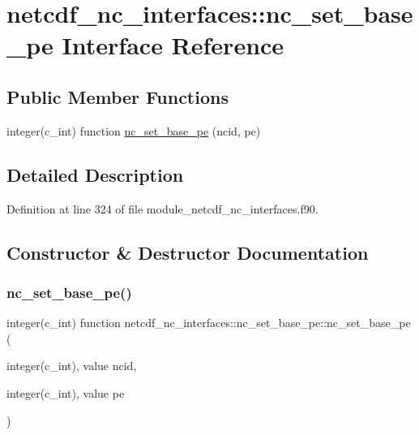 \hypertarget{interfacenetcdf__nc__interfaces_1_1nc__set__base__pe}{}\section{netcdf\+\_\+nc\+\_\+interfaces\+:\+:nc\+\_\+set\+\_\+base\+\_\+pe Interface Reference}
\label{interfacenetcdf__nc__interfaces_1_1nc__set__base__pe}
\subsection*{Public Member Functions}
\begin{DoxyCompactItemize}
\item 
integer(c\+\_\+int) function \hyperlink{interfacenetcdf__nc__interfaces_1_1nc__set__base__pe_ac69b3b3084c0d7830cab01ea902cdc50}{nc\+\_\+set\+\_\+base\+\_\+pe} (ncid, pe)
\end{DoxyCompactItemize}


\subsection{Detailed Description}


Definition at line 324 of file module\+\_\+netcdf\+\_\+nc\+\_\+interfaces.\+f90.



\subsection{Constructor \& Destructor Documentation}
\mbox{\label{interfacenetcdf__nc__interfaces_1_1nc__set__base__pe_ac69b3b3084c0d7830cab01ea902cdc50}} 
\subsubsection{\texorpdfstring{nc\+\_\+set\+\_\+base\+\_\+pe()}{nc\_set\_base\_pe()}}
{\footnotesize\ttfamily integer(c\+\_\+int) function netcdf\+\_\+nc\+\_\+interfaces\+::nc\+\_\+set\+\_\+base\+\_\+pe\+::nc\+\_\+set\+\_\+base\+\_\+pe (\begin{DoxyParamCaption}\item[{integer(c\+\_\+int), value}]{ncid,  }\item[{integer(c\+\_\+int), value}]{pe }\end{DoxyParamCaption})}



